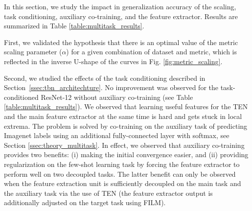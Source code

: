 \documentclass{article}
\begin{document}

In this section, we study the impact in generalization accuracy of the scaling, task conditioning, auxiliary co-training, and the feature extractor. Results are summarized in Table \ref{table:multitask_results}.

First, we validated the hypothesis that there is an optimal value of the metric scaling parameter ($\alpha$) for a given combination of dataset and metric, which is reflected in the inverse U-shape of the curves in Fig. \ref{fig:metric_scaling}.

Second, we studied the effects of the task conditioning described in Section~\ref{ssec:tbn_architechture}. No improvement was observed for the task-conditioned ResNet-12 without auxiliary co-training (see Table \ref{table:multitask_results}). We observed that learning useful features for the TEN and the main feature extractor at the same time is hard and gets stuck in local extrema. The problem is solved by co-training on the auxiliary task of predicting Imagenet labels using an additional fully-connected layer with softmax, see Section \ref{ssec:theory_multitask}. In effect, we observed that auxiliary co-training provides two benefits: (i) making the initial convergence easier, and (ii) providing regularization on the few-shot learning task by forcing the feature extractor to perform well on two decoupled tasks. The latter benefit can only be observed when the feature extraction unit is sufficiently decoupled on the main task and the auxiliary task via the use of TEN (the feature extractor output is additionally adjusted on the target task using FILM).
\end{document}
